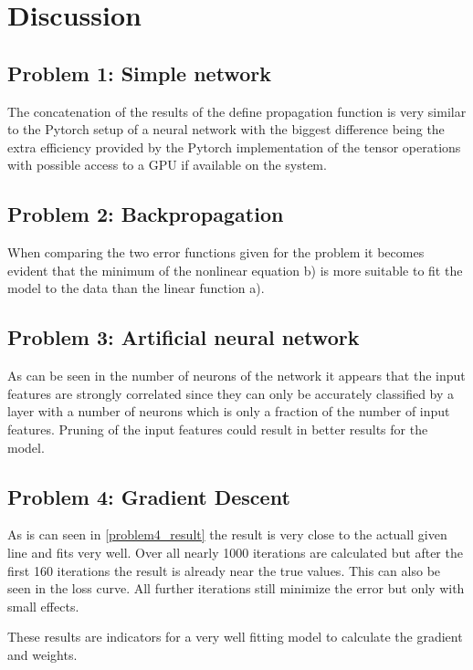 \chapter{Discussion}
\section{Problem 1: Simple network}
The concatenation of the results of the define propagation function is very similar to the Pytorch setup of a neural network with the biggest difference being the extra efficiency provided by the Pytorch implementation of the tensor operations with possible access to a GPU if available on the system.
\section{Problem 2: Backpropagation}
When comparing the two error functions given for the problem it becomes evident that the minimum of the nonlinear equation b) is more suitable to fit the model to the data than the linear function a).
\section{Problem 3: Artificial neural network}
As can be seen in the number of neurons of the network it appears that the input features are strongly correlated since they can only be accurately classified by a layer with a number of neurons which is only a fraction of the number of input features. Pruning of the input features could result in better results for the model.
\section{Problem 4: Gradient Descent}
As is can seen in \ref{problem4_result} the result is very close to the actuall given line and fits very well.
Over all nearly 1000 iterations are calculated but after the first 160 iterations the result is already near the true values. 
This can also be seen in the loss curve.
All further iterations still minimize the error but only with small effects.

These results are indicators for a very well fitting model to calculate the gradient and weights.
